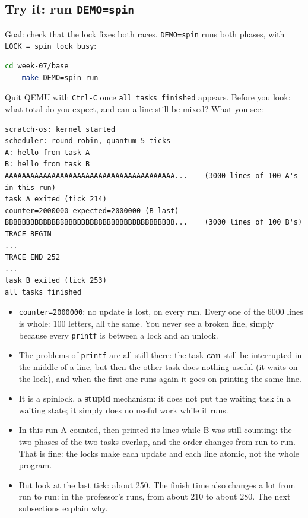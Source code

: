 \subsection{Try it: run \texttt{DEMO=spin}}
Goal: check that the lock fixes both races. \texttt{DEMO=spin} runs both phases, with \texttt{LOCK = spin\_lock\_busy}:
\begin{lstlisting}[language=bash]
    cd week-07/base
    make DEMO=spin run
\end{lstlisting}
Quit QEMU with \texttt{Ctrl-C} once \texttt{all tasks finished} appears. Before you look: what total do you expect, and can a line still be mixed? What you see:
{\verbatimscriptsize
\begin{verbatim}
scratch-os: kernel started
scheduler: round robin, quantum 5 ticks
A: hello from task A
B: hello from task B
AAAAAAAAAAAAAAAAAAAAAAAAAAAAAAAAAAAAAAAA...    (3000 lines of 100 A's in this run)
task A exited (tick 214)
counter=2000000 expected=2000000 (B last)
BBBBBBBBBBBBBBBBBBBBBBBBBBBBBBBBBBBBBBBB...    (3000 lines of 100 B's)
TRACE BEGIN
...
TRACE END 252
...
task B exited (tick 253)
all tasks finished
\end{verbatim}}
\begin{itemize}
    \item \texttt{counter=2000000}: no update is lost, on every run. Every one of the 6000 lines is whole: 100 letters, all the same. You never see a broken line, simply because every \texttt{printf} is between a lock and an unlock.
    \item The problems of \texttt{printf} are all still there: the task \textbf{can} still be interrupted in the middle of a line, but then the other task does nothing useful (it waits on the lock), and when the first one runs again it goes on printing the same line.
    \item It is a spinlock, a \textbf{stupid} mechanism: it does not put the waiting task in a waiting state; it simply does no useful work while it runs.
    \item In this run A counted, then printed its lines while B was still counting: the two phases of the two tasks overlap, and the order changes from run to run. That is fine: the locks make each update and each line atomic, not the whole program.
    \item But look at the last tick: about 250. The finish time also changes a lot from run to run: in the professor's runs, from about 210 to about 280. The next subsections explain why.
\end{itemize}


